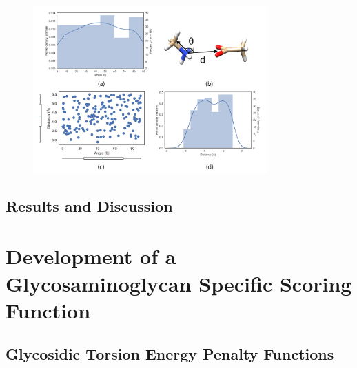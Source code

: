 \documentclass[a4paper, 12pt, openany]{book}
\begin{document}
\begin{figure}
    \centering
    \includegraphics[width=9cm]{Figures/Datamining/lys_carb.png}
    \caption{
    }
    \label{fig:my_label}
\end{figure}


\section{Results and Discussion}



\chapter{Development of a Glycosaminoglycan Specific Scoring Function}

\section{Glycosidic Torsion Energy Penalty Functions}
\end{document}
